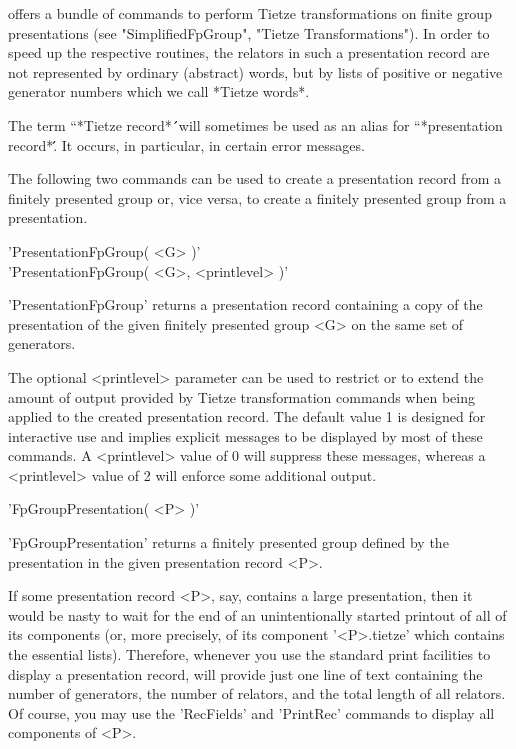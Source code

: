 {\GAP}  offers a bundle of commands to perform  Tietze transformations on
finite   group    presentations    (see    "SimplifiedFpGroup",   "Tietze
Transformations").  In  order  to speed  up the respective routines,  the
relators in such a presentation record are  not represented  by  ordinary
(abstract)  {\GAP} words,  but by lists of positive or negative generator
numbers which we call *Tietze words*.  

The term ``*Tietze  record*\'\'\  will  sometimes be used as an alias for
``*presentation record*\'\'.  It occurs, in particular, in certain  error
messages.  

The following  two  commands can be used to create a presentation  record
from a  finitely presented group  or, vice  versa, to  create a  finitely
presented group from a presentation.

\vspace{5mm}
'PresentationFpGroup( <G> )'%
 \\
'PresentationFpGroup( <G>, <printlevel> )'

'PresentationFpGroup' returns a presentation record containing a copy  of
the  presentation of the given finitely presented group  <G> on the  same
set of generators.

The  optional <printlevel> parameter can be used to restrict or to extend
the amount  of  output provided by  Tietze  transformation  commands when
being applied to the created presentation record.  The default value 1 is
designed  for  interactive  use  and  implies  explicit  messages  to  be
displayed  by most of  these  commands.   A <printlevel> value of  0 will
suppress these messages, whereas a <printlevel>  value of 2  will enforce
some additional output.

\vspace{5mm}
'FpGroupPresentation( <P> )'%

'FpGroupPresentation' returns a  finitely presented group defined  by the
presentation in the given presentation record <P>.

If some presentation record <P>, say, contains a large presentation, then
it  would  be nasty  to  wait for  the end of an  unintentionally started
printout of all of its components (or, more precisely, of  its  component
'<P>.tietze' which contains  the essential lists).   Therefore,  whenever
you use the standard print  facilities  to display a presentation record,
{\GAP}  will  provide just  one line of text  containing  the  number  of
generators, the number of relators, and the total length of all relators.
Of course, you may use the 'RecFields' and 'PrintRec' commands to display
all components of <P>.

